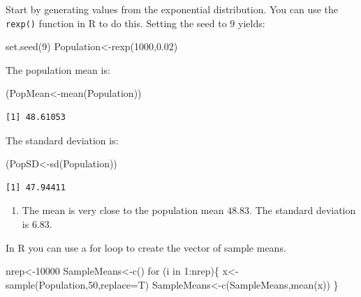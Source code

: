 \documentclass[
  letterpaper,
  DIV=11,
  numbers=noendperiod]{scrreprt}
\newenvironment{Shaded}{\begin{snugshade}}{\end{snugshade}}
\newcommand{\AttributeTok}[1]{\textcolor[rgb]{0.40,0.45,0.13}{#1}}
\newcommand{\ControlFlowTok}[1]{\textcolor[rgb]{0.00,0.23,0.31}{#1}}
\newcommand{\DecValTok}[1]{\textcolor[rgb]{0.68,0.00,0.00}{#1}}
\newcommand{\FloatTok}[1]{\textcolor[rgb]{0.68,0.00,0.00}{#1}}
\newcommand{\FunctionTok}[1]{\textcolor[rgb]{0.28,0.35,0.67}{#1}}
\newcommand{\NormalTok}[1]{\textcolor[rgb]{0.00,0.23,0.31}{#1}}
\newcommand{\OtherTok}[1]{\textcolor[rgb]{0.00,0.23,0.31}{#1}}
\newcommand{\SpecialCharTok}[1]{\textcolor[rgb]{0.37,0.37,0.37}{#1}}
\providecommand{\tightlist}{%
  \setlength{\itemsep}{0pt}\setlength{\parskip}{0pt}}\usepackage{longtable,booktabs,array}
\begin{document}
Start by generating values from the exponential distribution. You can
use the \texttt{rexp()} function in R to do this. Setting the seed to
\(9\) yields:

\begin{Shaded}
\begin{Highlighting}[numbers=left,,]
\FunctionTok{set.seed}\NormalTok{(}\DecValTok{9}\NormalTok{)}
\NormalTok{Population}\OtherTok{\textless{}{-}}\FunctionTok{rexp}\NormalTok{(}\DecValTok{1000}\NormalTok{,}\FloatTok{0.02}\NormalTok{)}
\end{Highlighting}
\end{Shaded}

The population mean is:

\begin{Shaded}
\begin{Highlighting}[numbers=left,,]
\NormalTok{(PopMean}\OtherTok{\textless{}{-}}\FunctionTok{mean}\NormalTok{(Population))}
\end{Highlighting}
\end{Shaded}

\begin{verbatim}
[1] 48.61053
\end{verbatim}

The standard deviation is:

\begin{Shaded}
\begin{Highlighting}[numbers=left,,]
\NormalTok{(PopSD}\OtherTok{\textless{}{-}}\FunctionTok{sd}\NormalTok{(Population))}
\end{Highlighting}
\end{Shaded}

\begin{verbatim}
[1] 47.94411
\end{verbatim}

\begin{enumerate}
\def\labelenumi{\arabic{enumi}.}
\setcounter{enumi}{1}
\tightlist
\item
  The mean is very close to the population mean \(48.83\). The standard
  deviation is \(6.83\).
\end{enumerate}

In R you can use a for loop to create the vector of sample means.

\begin{Shaded}
\begin{Highlighting}[numbers=left,,]
\NormalTok{nrep}\OtherTok{\textless{}{-}}\DecValTok{10000}
\NormalTok{SampleMeans}\OtherTok{\textless{}{-}}\FunctionTok{c}\NormalTok{()}
\ControlFlowTok{for}\NormalTok{ (i }\ControlFlowTok{in} \DecValTok{1}\SpecialCharTok{:}\NormalTok{nrep)\{}
\NormalTok{  x}\OtherTok{\textless{}{-}}\FunctionTok{sample}\NormalTok{(Population,}\DecValTok{50}\NormalTok{,}\AttributeTok{replace=}\NormalTok{T)}
\NormalTok{  SampleMeans}\OtherTok{\textless{}{-}}\FunctionTok{c}\NormalTok{(SampleMeans,}\FunctionTok{mean}\NormalTok{(x))}
\NormalTok{\}}
\end{Highlighting}
\end{Shaded}
\end{document}
